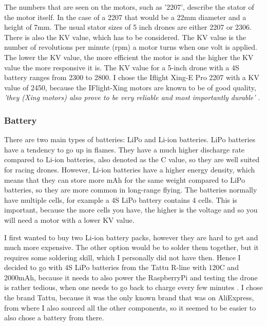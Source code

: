 \documentclass[svgnames]{article}
\begin{document}
	The numbers that are seen on the motors, such as '2207', describe the stator of the motor itself. In the case of a 2207 that would be a 22mm diameter and a height of 7mm. The usual stator sizes of 5 inch drones are either 2207 or 2306. There is also the KV value, which has to be considered. The KV value is the number of revolutions per minute (rpm) a motor turns when one volt is applied. The lower the KV value, the more efficient the motor is and the higher the KV value the more responsive it is. The KV value for a 5-inch drone with a 4S battery ranges from 2300 to 2800. I chose the Iflight Xing-E Pro 2207\cite{xingepro} with a KV value of 2450, because the IFlight-Xing motors are known to be of good quality, \textit{'they (Xing motors) also prove to be very reliable and most importantly durable'} \textcite{xingreview}. 


	
	\subsubsection{Battery}
	There are two main types of batteries: \gls{LiPo} and \gls{Li-ion} batteries. \gls{LiPo} batteries have a tendency to go up in flames. They have a much higher discharge rate compared to \gls{Li-ion} batteries, also denoted as the C value, so they are well suited for racing drones. However, \gls{Li-ion} batteries have a higher energy density, which means that they can store more mAh for the same weight compared to \gls{LiPo} batteries, so they are more common in long-range flying. The batteries normally have multiple cells, for example a 4S \gls{LiPo} battery contains 4 cells. This is important, because the more cells you have, the higher is the voltage and so you will need a motor with a lower KV value. 
	 
	I first wanted to buy two \gls{Li-ion} battery packs, however they are hard to get and much more expensive. The other option would be to solder them together, but it requires some soldering skill, which I personally did not have then. Hence I decided to go with 4S \gls{LiPo} batteries from the Tattu R-line with 120C and 2000mAh, because it needs to also power the RaspberryPi and testing the drone is rather tedious, when one needs to go back to charge every few minutes \cite{tattu}. I chose the brand Tattu, because it was the only known brand that was on AliExpress, from where I also sourced all the other components, so it seemed to be easier to also chose a battery from there. 
\end{document}
